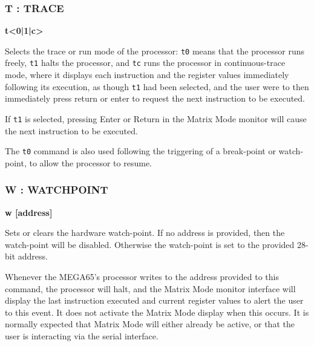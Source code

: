 \subsubsection{T : TRACE}
\begin{description}[leftmargin=2cm,style=nextline]
\item [Format:] {\bf t<0|1|c>}
\item [Usage:] Selects the trace or run mode of the processor: {\tt t0} means that the
  processor runs freely, {\tt t1} halts the processor, and {\tt tc} runs the processor
  in continuous-trace mode, where it displays each instruction and the register values
  immediately following its execution, as though {\tt t1} had been selected, and the user
  were to then immediately press return or enter to request the next instruction to be
  executed.

  If {\tt t1} is selected, pressing Enter or Return in the Matrix Mode monitor will cause
  the next instruction to be executed.

  The {\tt t0} command is also used following the triggering of a break-point or watch-point,
  to allow the processor to resume.

\end{description}

\subsubsection{W : WATCHPOINT}
\begin{description}[leftmargin=2cm,style=nextline]
\item [Format:] {\bf w [address]}
\item [Usage:] Sets or clears the hardware watch-point. If no address is provided,
  then the watch-point will be disabled. Otherwise the watch-point is set to the
  provided 28-bit address.

  Whenever the MEGA65's processor writes to the address
  provided to this command, the processor will halt, and the Matrix Mode monitor interface
  will display the last instruction executed and current register values to alert the user
  to this event.  It does not activate the Matrix Mode display when this occurs.
  It is
  normally expected that Matrix Mode will either already be active, or that the user is
  interacting via the serial interface.

\end{description}

